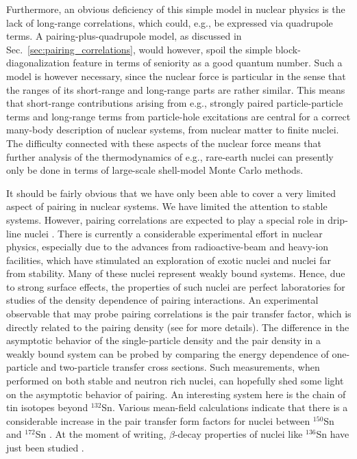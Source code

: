 \documentclass[preprint,rmp,aps,floatfix]{revtex4}
\begin{document}
Furthermore, an obvious deficiency of this simple model in nuclear physics
is the lack of long-range correlations, which could, e.g., 
be expressed via quadrupole terms. A pairing-plus-quadrupole model,
as discussed in  Sec.~\ref{sec:pairing_correlations}, would however, spoil
the simple block-diagonalization feature in terms of seniority as a good 
quantum number. Such a model is however necessary, since the nuclear force
is particular in the sense that the ranges of its short-range and long-range
parts are rather similar. This means that short-range contributions arising
from e.g., strongly paired particle-particle terms and 
long-range terms from particle-hole excitations  
are central for a correct many-body
description of nuclear systems, from nuclear matter to finite nuclei. 
The difficulty connected with these aspects of the nuclear force means
that further 
analysis of the thermodynamics of e.g.,
rare-earth nuclei can presently only be done  
in terms of large-scale shell-model Monte Carlo methods.



It should be fairly obvious that we have only been able to cover
a very limited aspect of pairing in nuclear systems.
We have limited the attention to stable systems. However, 
pairing correlations are expected to play a special role
in drip-line nuclei \cite{dob_96}. There is currently a considerable
experimental effort in nuclear physics, especially due to the 
advances from radioactive-beam and heavy-ion 
facilities, which  have stimulated an exploration of exotic nuclei and 
nuclei far from stability. Many of these nuclei represent weakly bound systems.
Hence, due to strong surface effects, the properties of such nuclei
are perfect laboratories for studies of the density dependence of 
pairing interactions. An experimental observable that may probe
pairing correlations is the pair transfer factor, which is directly related 
to the pairing density (see \cite{jacekwitek1998} for more details). 
The difference in the asymptotic behavior of 
the single-particle density and the pair density in a weakly bound system can 
be probed by comparing the energy dependence 
of one-particle and two-particle transfer cross sections.
Such measurements, when performed on both stable and neutron rich nuclei,
can hopefully shed some light on the asymptotic behavior of pairing. 
An interesting system here is the chain of tin isotopes beyond $^{132}$Sn.
Various mean-field calculations \cite{dob_96} indicate that there is a
considerable increase in the pair transfer form factors for nuclei 
between  $^{150}$Sn and  $^{172}$Sn \cite{dob_96}. At the moment of writing,
$\beta$-decay properties of nuclei like  $^{136}$Sn have just been studied
\cite{shergur2002}. 
 
\end{document}
